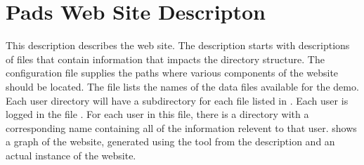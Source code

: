 \documentclass[nocopyrightspace,natbib,onecolumn,9pt]{sigplanconf}
\begin{document}
\section{Pads Web Site Descripton}
This \forest{} description describes the \pads{} web site. The
description starts with \pads{} descriptions of files that contain
information that impacts the directory structure. The
configuration file supplies the paths where various components of the
website should be located.  The  file lists the names
of the data files available for the demo.  Each user directory will
have a subdirectory for each file listed in . Each
user is logged in the file .  For each user in this
file, there is a directory with a corresponding name containing all of
the information relevent to that user.  shows a graph
of the \pads{} website, generated using the  tool from
the description and an actual instance of the \pads{} website.

\end{document}
